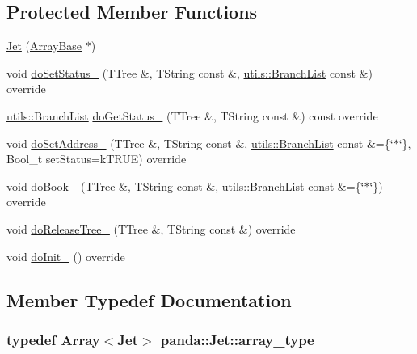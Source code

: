 \subsection*{Protected Member Functions}
\begin{DoxyCompactItemize}
\item 
\hyperlink{classpanda_1_1Jet_a8de74ad474ca0a70037c372b59b4cd1e}{Jet} (\hyperlink{classpanda_1_1ArrayBase}{ArrayBase} $\ast$)
\item 
void \hyperlink{classpanda_1_1Jet_a494d27c6c2b773f5849996944cf46eb2}{doSetStatus\_\-} (TTree \&, TString const \&, \hyperlink{classpanda_1_1utils_1_1BranchList}{utils::BranchList} const \&) override
\item 
\hyperlink{classpanda_1_1utils_1_1BranchList}{utils::BranchList} \hyperlink{classpanda_1_1Jet_a4ecbac39b42fe464f6346711aed38aba}{doGetStatus\_\-} (TTree \&, TString const \&) const override
\item 
void \hyperlink{classpanda_1_1Jet_a4e59030d68ca3a27fb72f0c0976bdb27}{doSetAddress\_\-} (TTree \&, TString const \&, \hyperlink{classpanda_1_1utils_1_1BranchList}{utils::BranchList} const \&=\{\char`\"{}$\ast$\char`\"{}\}, Bool\_\-t setStatus=kTRUE) override
\item 
void \hyperlink{classpanda_1_1Jet_a9f7d21237e7933ee156f5edea6a27696}{doBook\_\-} (TTree \&, TString const \&, \hyperlink{classpanda_1_1utils_1_1BranchList}{utils::BranchList} const \&=\{\char`\"{}$\ast$\char`\"{}\}) override
\item 
void \hyperlink{classpanda_1_1Jet_a3bc50ef589095a1bae03b1f4bbf74077}{doReleaseTree\_\-} (TTree \&, TString const \&) override
\item 
void \hyperlink{classpanda_1_1Jet_ac8801b9ee9b645f4d0a24aa34accb414}{doInit\_\-} () override
\end{DoxyCompactItemize}


\subsection{Member Typedef Documentation}
\hypertarget{classpanda_1_1Jet_a02ed819ca5ca46b0b3b212dbd56bce57}{
\subsubsection[{array\_\-type}]{\setlength{\rightskip}{0pt plus 5cm}typedef {\bf Array}$<${\bf Jet}$>$ {\bf panda::Jet::array\_\-type}}}
\label{classpanda_1_1Jet_a02ed819ca5ca46b0b3b212dbd56bce57}


